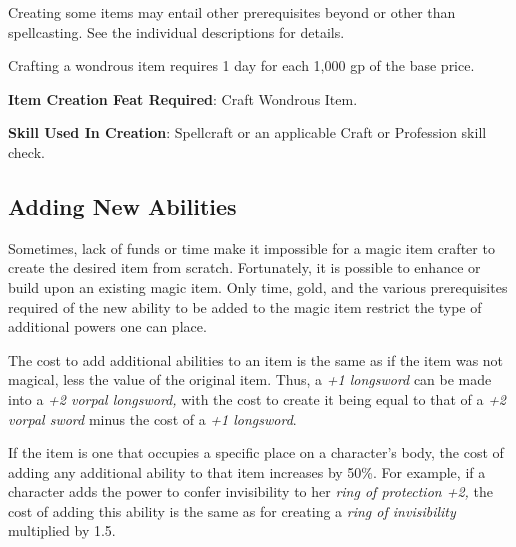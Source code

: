 Creating some items may entail other prerequisites beyond or other than spellcasting. See the individual descriptions for details.
				
Crafting a wondrous item requires 1 day for each 1,000 gp of the base price.
				
\textbf{Item Creation Feat Required}: Craft Wondrous Item.
				
\textbf{Skill Used In Creation}: Spellcraft or an applicable Craft or Profession skill check.
				
\subsection{Adding New Abilities}

				
Sometimes, lack of funds or time make it impossible for a magic item crafter to create the desired item from scratch. Fortunately, it is possible to enhance or build upon an existing magic item. Only time, gold, and the various prerequisites required of the new ability to be added to the magic item restrict the type of additional powers one can place.
				
The cost to add additional abilities to an item is the same as if the item was not magical, less the value of the original item. Thus, a \textit{+1 longsword} can be made into a \textit{+2 vorpal longsword,} with the cost to create it being equal to that of a \textit{+2 vorpal sword} minus the cost of a \textit{+1 longsword}.
				
If the item is one that occupies a specific place on a character's body, the cost of adding any additional ability to that item increases by 50\%. For example, if a character adds the power to confer invisibility to her \textit{ring of protection +2,} the cost of adding this ability is the same as for creating a \textit{ring of invisibility} multiplied by 1.5. 
